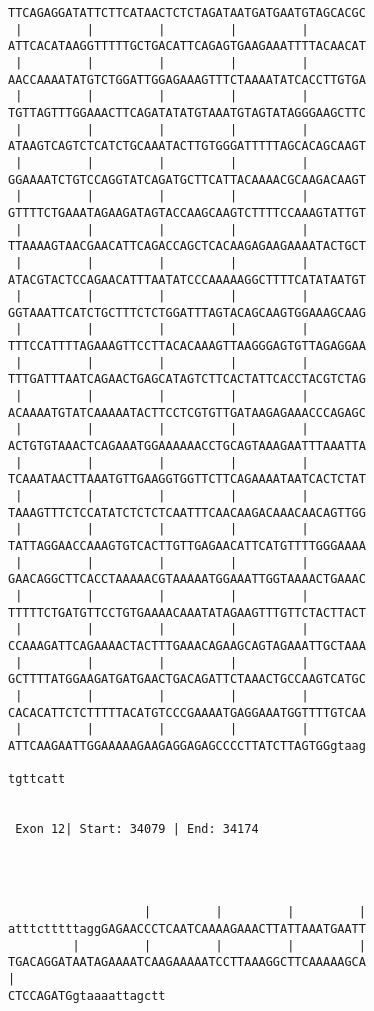 \documentclass{article}
\begin{document}
\begin{Verbatim}
TTCAGAGGATATTCTTCATAACTCTCTAGATAATGATGAATGTAGCACGC
 |         |         |         |         |        
ATTCACATAAGGTTTTTGCTGACATTCAGAGTGAAGAAATTTTACAACAT
 |         |         |         |         |        
AACCAAAATATGTCTGGATTGGAGAAAGTTTCTAAAATATCACCTTGTGA
 |         |         |         |         |        
TGTTAGTTTGGAAACTTCAGATATATGTAAATGTAGTATAGGGAAGCTTC
 |         |         |         |         |        
ATAAGTCAGTCTCATCTGCAAATACTTGTGGGATTTTTAGCACAGCAAGT
 |         |         |         |         |        
GGAAAATCTGTCCAGGTATCAGATGCTTCATTACAAAACGCAAGACAAGT
 |         |         |         |         |        
GTTTTCTGAAATAGAAGATAGTACCAAGCAAGTCTTTTCCAAAGTATTGT
 |         |         |         |         |        
TTAAAAGTAACGAACATTCAGACCAGCTCACAAGAGAAGAAAATACTGCT
 |         |         |         |         |        
ATACGTACTCCAGAACATTTAATATCCCAAAAAGGCTTTTCATATAATGT
 |         |         |         |         |        
GGTAAATTCATCTGCTTTCTCTGGATTTAGTACAGCAAGTGGAAAGCAAG
 |         |         |         |         |        
TTTCCATTTTAGAAAGTTCCTTACACAAAGTTAAGGGAGTGTTAGAGGAA
 |         |         |         |         |        
TTTGATTTAATCAGAACTGAGCATAGTCTTCACTATTCACCTACGTCTAG
 |         |         |         |         |        
ACAAAATGTATCAAAAATACTTCCTCGTGTTGATAAGAGAAACCCAGAGC
 |         |         |         |         |        
ACTGTGTAAACTCAGAAATGGAAAAAACCTGCAGTAAAGAATTTAAATTA
 |         |         |         |         |        
TCAAATAACTTAAATGTTGAAGGTGGTTCTTCAGAAAATAATCACTCTAT
 |         |         |         |         |        
TAAAGTTTCTCCATATCTCTCTCAATTTCAACAAGACAAACAACAGTTGG
 |         |         |         |         |        
TATTAGGAACCAAAGTGTCACTTGTTGAGAACATTCATGTTTTGGGAAAA
 |         |         |         |         |        
GAACAGGCTTCACCTAAAAACGTAAAAATGGAAATTGGTAAAACTGAAAC
 |         |         |         |         |        
TTTTTCTGATGTTCCTGTGAAAACAAATATAGAAGTTTGTTCTACTTACT
 |         |         |         |         |        
CCAAAGATTCAGAAAACTACTTTGAAACAGAAGCAGTAGAAATTGCTAAA
 |         |         |         |         |        
GCTTTTATGGAAGATGATGAACTGACAGATTCTAAACTGCCAAGTCATGC
 |         |         |         |         |        
CACACATTCTCTTTTTACATGTCCCGAAAATGAGGAAATGGTTTTGTCAA
 |         |         |         |         |        
ATTCAAGAATTGGAAAAAGAAGAGGAGAGCCCCTTATCTTAGTGGgtaag

tgttcatt


 Exon 12| Start: 34079 | End: 34174 




                   |         |         |         |
atttctttttaggGAGAACCCTCAATCAAAAGAAACTTATTAAATGAATT
         |         |         |         |         |
TGACAGGATAATAGAAAATCAAGAAAAATCCTTAAAGGCTTCAAAAAGCA
|        
CTCCAGATGgtaaaattagctt



\end{Verbatim}
\end{document}

